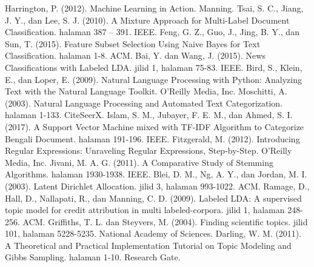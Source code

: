 
\begin{thebibliography}{12}

{Harrington, P. (2012). Machine Learning in Action. Manning.}
{Tsai, S. C., Jiang, J. Y., dan Lee, S. J. (2010). A Mixture Approach for Multi-Label Document Classification. halaman 387 – 391. IEEE.}
{Feng, G. Z., Guo, J., Jing, B. Y., dan Sun, T. (2015). Feature Subset Selection Using Naive Bayes for Text Classification. halaman 1-8. ACM.}
{Bai, Y. dan Wang, J. (2015). News Classifications with Labeled LDA. jilid 1, halaman 75-83. IEEE.}
{Bird, S., Klein, E., dan Loper, E. (2009). Natural Language Processing with Python: Analyzing Text with the Natural Language Toolkit. O'Reilly Media, Inc.}
{Moschitti, A. (2003). Natural Language Processing and Automated Text Categorization. halaman 1-133. CiteSeerX.}
{Islam, S. M., Jubayer, F. E. M., dan Ahmed, S. I. (2017). A Support Vector Machine mixed with TF-IDF Algorithm to Categorize Bengali Document. halaman 191-196. IEEE.}
{Fitzgerald, M. (2012). Introducing Regular Expressions: Unraveling Regular Expressions, Step-by-Step. O'Reilly Media, Inc.}
{Jivani, M. A. G. (2011). A Comparative Study of Stemming Algorithms. halaman 1930-1938. IEEE.}
{Blei, D. M., Ng, A. Y., dan Jordan, M. I. (2003). Latent Dirichlet Allocation. jilid 3, halaman 993-1022. ACM.}
{Ramage, D., Hall, D., Nallapati, R., dan Manning, C. D. (2009). Labeled LDA: A supervised topic model for credit attribution in multi labeled-corpora. jilid 1, halaman 248-256. ACM.}
{Griffiths, T. L. dan Steyvers, M. (2004). Finding scientific topics. jilid 101, halaman 5228-5235. National Academy of Sciences.}
{Darling, W. M. (2011). A Theoretical and Practical Implementation Tutorial on Topic Modeling and Gibbs Sampling. halaman 1-10. Research Gate.}

\end{thebibliography}
